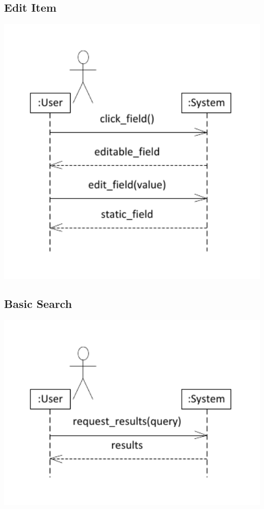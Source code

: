 \documentclass{article}
\begin{document}
\subsection{Edit Item}
\includegraphics[keepaspectratio, width=6in]{ssd_edit_item_details.pdf}\\

\subsection{Basic Search}
\includegraphics[keepaspectratio, width=6in]{ssd_basic_search.pdf}\\
\end{document}

